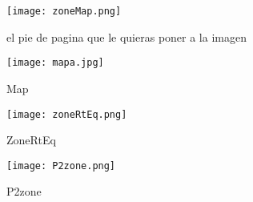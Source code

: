 \graphicspath{{../Graphics/Cpt2-InjectCW/}}


			\begin{figure}[H]
				\centering
				\texttt{[image: zoneMap.png]}
				\caption{\label{Img:widgets}el pie de pagina que le quieras 	poner a la imagen}
			\end{figure}

			\begin{figure}[H]
				\centering
				\texttt{[image: mapa.jpg]}
				\caption{\label{fig:map}Map}	
			\end{figure}

			\begin{figure}[H]
				\centering
				\texttt{[image: zoneRtEq.png]}
				\caption{\label{fig:zoneRtEq}ZoneRtEq}	
			\end{figure}

			\begin{figure}[H]
				\centering
				\texttt{[image: P2zone.png]}
				\caption{\label{fig:P2zone}P2zone}	
			\end{figure}
